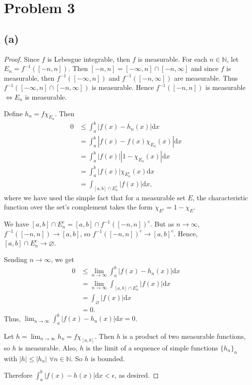 \documentclass{article}
\newcommand{\N}{\mathbb{N}} %
\begin{document}
\section*{Problem 3}
\subsection*{(a)}
\begin{proof}
	Since $f$ is Lebesgue integrable, then $f$ is measurable. For each $n \in \N$, let $E_n = f^{-1}([-n, n])$. Then $[-n, n] = [-\infty, n] \cap [-n, \infty]$ and since $f$ is measurable, then $f^{-1}([-\infty, n])$ and $f^{-1}([-n, \infty])$ are measurable. Thus \\$f^{-1}([-\infty, n] \cap [-n, \infty])$ is measurable. Hence $f^{-1}([-n, n])$ is measurable $\iff E_n$ is measurable.
	
	Define $h_n = f\chi_{E_n}$. Then
	\begin{align}
		0 &\leq \int_a^b |f(x) - h_n(x)| \mathrm{d}x\\
		&= \int_a^b |f(x) - f(x)\chi_{E_n}(x)| \mathrm{d}x \\
		&= \int_a^b |f(x)||1 - \chi_{E_n}(x)| \mathrm{d}x \\
		&= \int_a^b |f(x)|\chi_{E_n^c}(x) \mathrm{d}x \\
		&= \int_{[a, b]\cap E_n^c}|f(x)| \mathrm{d}x,
	\end{align}
	where we have used the simple fact that for a measurable set $E$, the characteristic function over the set's complement takes the form $\chi_{E^c} = 1 - \chi_{E}$.
	
	We have $[a, b] \cap E_n^c = [a, b] \cap f^{-1}([-n, n])^c$. But as $n \to \infty$, \\$f^{-1}([-n, n]) \to [a, b]$, so $f^{-1}([-n, n])^c \to [a, b]^c$. Hence, $[a, b] \cap E_n^c \to \varnothing$.
	
	Sending $n \to \infty$, we get
	\begin{align}
		0 &\leq \lim_{n \to \infty}\int_a^b |f(x) - h_n(x)| \mathrm{d}x \\
		&= \lim_{n \to \infty} \int_{[a, b]\cap E_n^c} |f(x)| \mathrm{d}x \\
		&= \int_{\varnothing}|f(x)| \mathrm{d}x \\
		&= 0.
	\end{align}
	Thus, $\lim_{n \to \infty}\int_a^b |f(x) - h_n(x)| \mathrm{d}x = 0$.
	
	Let $h = \lim_{n \to \infty}h_n = f \chi_{[a, b]}$. Then $h$ is a product of two measurable functions, so $h$ is measurable. Also, $h$ is the limit of a sequence of simple functions $\{h_n\}_n$ with $|h| \leq |h_n|$ $\forall n \in \N$. So $h$ is bounded.
	
	Therefore $\int_{a}^b |f(x) - h(x)|\mathrm{d}x < \epsilon$, as desired.
\end{proof}
	
\end{document}
